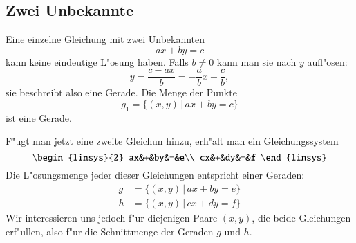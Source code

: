 \subsection{Zwei Unbekannte}
Eine einzelne Gleichung mit zwei Unbekannten 
\[
ax+by=c
\]
kann keine eindeutige L"osung haben.
Falls $b\ne 0$ kann man
sie nach $y$ aufl"osen:
\[
y=\frac{c-ax}b=-\frac{a}{b}x+\frac{c}b,
\]
sie beschreibt also eine Gerade.
Die Menge der Punkte 
\[
g_1=\{(x,y)\,|\,ax+by=c\}
\]
ist eine Gerade.

F"ugt man jetzt eine zweite Gleichun hinzu, erh"alt man
ein Gleichungssystem
\[
\begin{linsys}{2}
ax&+&by&=&e\\
cx&+&dy&=&f
\end{linsys}
\]
Die L"osungsmenge jeder dieser Gleichungen entspricht einer
Geraden:
\begin{align*}
g&=\{(x,y)\,|\,ax+by=e\}\\
h&=\{(x,y)\,|\,cx+dy=f\}
\end{align*}
Wir interessieren uns jedoch f"ur diejenigen Paare $(x,y)$,
die beide Gleichungen erf"ullen, also f"ur die Schnittmenge
der Geraden $g$ und $h$.

